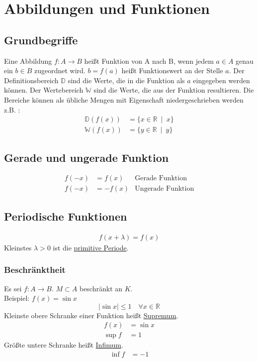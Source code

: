 \section{Abbildungen und Funktionen}
\subsection{Grundbegriffe}
Eine Abbildung $f: A \rightarrow B$ heißt Funktion von A nach B, wenn jedem $a \in A$ genau ein $b \in B$ zugeordnet wird. $b = f(a)$ heißt Funktionswert an der Stelle $a$. Der Definitionsbereich $\mathbb{D}$ sind die Werte,  die in die Funktion als $a$ eingegeben werden können. Der Wertebereich $\mathbb{W}$ sind die Werte, die aus der Funktion resultieren. Die Bereiche können als übliche Mengen mit Eigenschaft niedergeschrieben werden z.B. :
\begin{align*}
\mathbb{D}(f(x)) &= \{ x \in \mathbb{R} \enspace | \enspace x \}\\
\mathbb{W}(f(x)) &= \{ y \in \mathbb{R} \enspace | \enspace y \}
\end{align*}
\subsection{Gerade und ungerade Funktion}
\begin{align*}
f(-x) &= f(x) &\text{Gerade Funktion}\\ 
f(-x) &= -f(x) &\text{Ungerade Funktion}
\end{align*}
\subsection{Periodische Funktionen}
\begin{align*}
f(x+\lambda ) = f(x)
\end{align*}
Kleinstes $\lambda > 0$ ist die \underline{primitive Periode}.
\subsubsection{Beschränktheit}
Es sei $f: A \rightarrow B$. $M \subset A$ beschränkt an $K$.\\
Beispiel: $f(x) = \sin{x}$
$$| \sin{x} | \leq 1 \quad \forall x \in \mathbb{R}$$
Kleinste obere Schranke einer Funktion heißt \underline{Supremum}.
\begin{align*}
f(x) &= \sin{x}\\
\sup{f} &= 1
\end{align*}
Größte untere Schranke heißt \underline{Infimum}.
\begin{align*}
\inf{f} &= -1
\end{align*}
